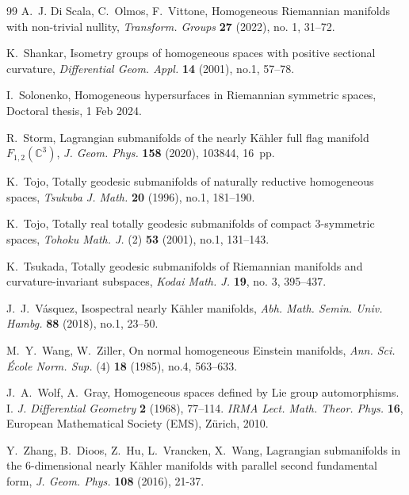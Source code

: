 \documentclass[11pt,a4paper,final]{amsart}
\newcommand{\C}{\mathbb{C}}
\theoremstyle{definition}
\begin{document}
\begin{thebibliography}{99}
	A.~J. Di Scala, C.~Olmos, F.~Vittone, Homogeneous Riemannian manifolds with non-trivial nullity, \textit{ Transform. Groups} \textbf{27} (2022), no. 1, 31--72.
	
	K.~Shankar, Isometry groups of homogeneous spaces with positive sectional curvature, \textit{Differential Geom. Appl.} \textbf{14} (2001), no.1, 57--78.

	I.~Solonenko, Homogeneous hypersurfaces in Riemannian symmetric spaces, Doctoral thesis, 1 Feb 2024.
	
	R.~Storm, Lagrangian submanifolds of the nearly Kähler full flag manifold $F_{1,2}(\C^{3})$, \textit{J. Geom. Phys.} \textbf{158} (2020), 103844, 16~pp.


	K.~Tojo, Totally geodesic submanifolds of naturally reductive homogeneous spaces, \textit{Tsukuba J. Math.} \textbf{20} (1996), no.1, 181--190.
	
	K.~Tojo, Totally real totally geodesic submanifolds of compact 3-symmetric spaces, \textit{Tohoku Math. J.} (2) \textbf{53} (2001), no.1, 131--143.
	
	K.~Tsukada, Totally geodesic submanifolds of Riemannian manifolds and curvature-invariant subspaces, \textit{Kodai Math. J.} \textbf{19}, no. 3, 395--437.
	
	J.~J.~Vásquez, Isospectral nearly Kähler manifolds, \textit{Abh. Math. Semin. Univ. Hambg.} \textbf{88} (2018), no.1, 23--50.
	
	M.~Y.~Wang, W.~Ziller, On normal homogeneous Einstein manifolds, \textit{Ann. Sci. École Norm. Sup.} (4) \textbf{18} (1985), no.4, 563--633.
	
	J.~A.~Wolf, A.~Gray, Homogeneous spaces defined by Lie group automorphisms. I. \textit{J. Differential Geometry} \textbf{2} (1968), 77--114. \textit{IRMA Lect. Math. Theor. Phys.} \textbf{16}, European Mathematical Society (EMS), Zürich, 2010.

	Y.~Zhang, B.~Dioos, Z.~Hu, L.~Vrancken, X.~Wang, Lagrangian submanifolds in the 6-dimensional nearly Kähler manifolds with parallel second fundamental form, \textit{J. Geom. Phys.} \textbf{108} (2016), 21-37.

	\end{thebibliography}
\end{document}
